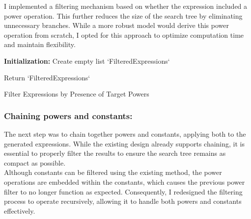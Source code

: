\documentclass{article}
\begin{document}
I implemented a filtering mechanism based on whether the expression included a power operation. This further reduces the size of the search tree by eliminating unnecessary branches. While a more robust model would derive this power operation from scratch, I opted for this approach to optimize computation time and maintain flexibility.\\


\begin{algorithm}[H]
\SetAlgoLined
{}

\textbf{Initialization:}\;
Create empty list `FilteredExpressions`\;


Return `FilteredExpressions`\;

\caption{Filter Expressions by Presence of Target Powers}
\label{alg:filter_powers} %
\end{algorithm}



\subsubsection{Chaining powers and constants:}

The next step was to chain together powers and constants, applying both to the generated expressions. While the existing design already supports chaining, it is essential to properly filter the results to ensure the search tree remains as compact as possible.\\

Although constants can be filtered using the existing method, the power operations are embedded within the constants, which causes the previous power filter to no longer function as expected. Consequently, I redesigned the filtering process to operate recursively, allowing it to handle both powers and constants effectively.\\
\end{document}
